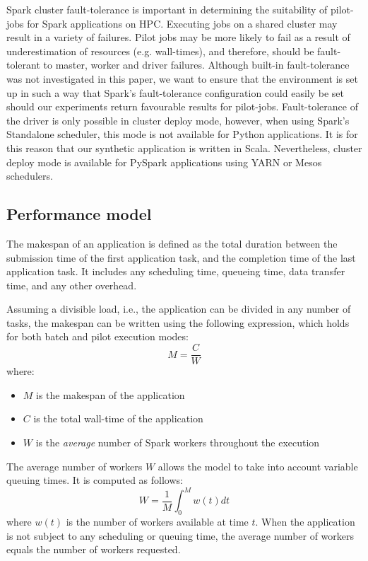 \documentclass{IEEEtran}
\begin{document}
    Spark cluster fault-tolerance is important in determining the suitability of
    pilot-jobs for Spark applications on HPC. Executing jobs on a shared cluster may
    result in a variety of failures. Pilot jobs may be more likely to fail as a result of
    underestimation of resources (e.g. wall-times), and therefore, should be fault-tolerant
    to master, worker and driver failures. Although built-in fault-tolerance was not
    investigated in this paper, we want to ensure that the environment is set up in such
    a way that Spark's fault-tolerance configuration could easily be set should our 
    experiments return favourable results for pilot-jobs.
    Fault-tolerance of the driver is only possible in cluster deploy mode, however,
    when using Spark's Standalone scheduler, this mode is not available for Python 
    applications. It is for this reason that our synthetic application is written
    in Scala. Nevertheless, cluster deploy mode is available for PySpark applications
    using YARN or Mesos schedulers.


    \subsection{Performance model}

    The makespan of an application is defined as the total duration
    between the submission time of the first application task, and the
    completion time of the last application task. It includes any
    scheduling time, queueing time, data transfer time, and any other
    overhead.
    
    Assuming a divisible load, i.e., the application can be divided in any
    number of tasks, the makespan can be written using the following
    expression, which holds for both batch and pilot execution modes:
    \begin{equation}
        M = \frac{C}{W} \label{eq:mcw}
    \end{equation}
    where:
    \begin{itemize}
        \item $M$ is the makespan of the application
        \item $C$ is the total wall-time of the application
        \item $W$ is the \emph{average} number of Spark workers throughout the execution
    \end{itemize}
    The average number of workers $W$ allows the model to take into account
     variable queuing times. It is computed as follows:
    \begin{equation}
        W = \frac{1}{M}\int_0^M{w(t)dt}\label{eq:avgw}
    \end{equation}
    where $w(t)$ is the number of workers available at time $t$. When the
    application is not subject to any scheduling or queuing time, the
    average number of workers equals the number of workers requested. 
\end{document}
